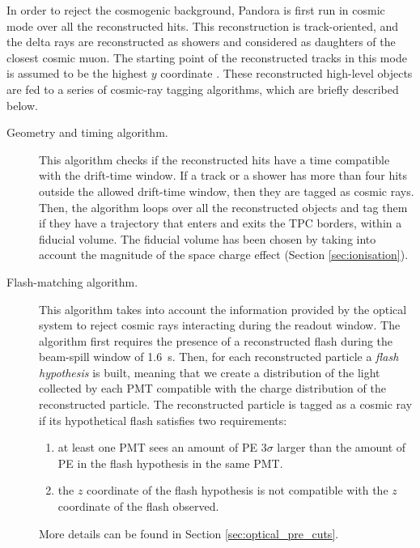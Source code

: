 In order to reject the cosmogenic background, Pandora is first run in cosmic mode over all the reconstructed hits. This reconstruction is track-oriented, and the delta rays are reconstructed as showers and considered as daughters of the closest cosmic muon. The starting point of the reconstructed tracks in this mode is assumed to be the highest $y$ coordinate \cite{Acciarri:2017hat}.
These reconstructed high-level objects are fed to a series of cosmic-ray tagging algorithms, which are briefly described below.
\begin{description}
\item[Geometry and timing algorithm.] This algorithm checks if the reconstructed hits have a time compatible with the drift-time window. If a track or a shower has more than four hits outside the allowed drift-time window, then they are tagged as cosmic rays. Then, the algorithm loops over all the reconstructed objects and tag them if they have a trajectory that enters and exits the TPC borders, within a fiducial volume. The fiducial volume has been chosen by taking into account the magnitude of the space charge effect (Section \ref{sec:ionisation}).
\item[Flash-matching algorithm.]{This algorithm takes into account the information provided by the optical system to reject cosmic rays interacting during the readout window. The algorithm first requires the presence of a reconstructed flash during the beam-spill window of 1.6~\si{\micro}s. Then, for each reconstructed particle a \emph{flash hypothesis} is built, meaning that we create a distribution of the light collected by each PMT compatible with the charge distribution of the reconstructed particle. The reconstructed particle is tagged as a cosmic ray if its hypothetical flash satisfies two requirements:
\begin{enumerate}
    \item at least one PMT sees an amount of PE $3\sigma$ larger than the amount of PE in the flash hypothesis in the same PMT.
    \item the $z$ coordinate of the flash hypothesis is not compatible with the $z$ coordinate of the flash observed.
\end{enumerate}}
More details can be found in Section \ref{sec:optical_pre_cuts}.


\end{description}
